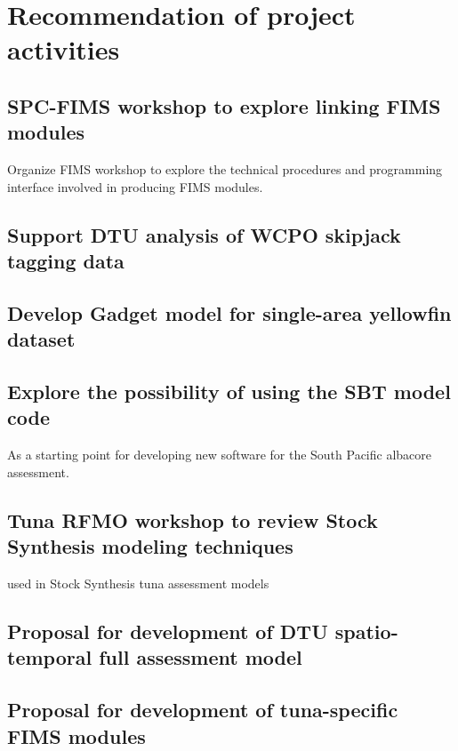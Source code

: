 \documentclass{SCreport}
\begin{document}
\section{Recommendation of project activities}

\subsection{SPC-FIMS workshop to explore linking FIMS modules}
\label{sec:fims-workshop}

Organize FIMS workshop to explore the technical procedures and programming
interface involved in producing FIMS modules.

\subsection{Support DTU analysis of WCPO skipjack tagging data}

\subsection{Develop Gadget model for single-area yellowfin dataset}
\label{sec:yft-gadget}

\subsection{Explore the possibility of using the SBT model code}

As a starting point for developing new software for the South Pacific albacore
assessment.

\subsection{Tuna RFMO workshop to review Stock Synthesis modeling techniques}
\label{sec:ss-workshop}

used in Stock Synthesis tuna assessment models

\subsection{Proposal for development of DTU spatio-temporal full assessment
  model}

\subsection{Proposal for development of tuna-specific FIMS modules}
\end{document}

